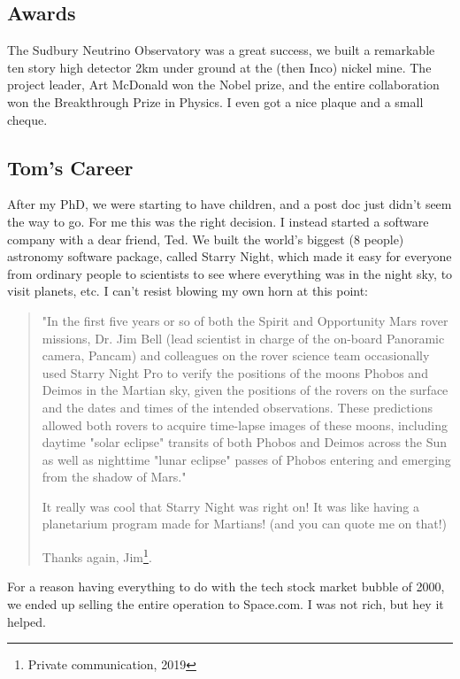 \documentclass[../rzero]{subfiles}
\begin{document}
\subsection*{Awards}
The Sudbury Neutrino Observatory was a great success, we built a remarkable ten story high detector 2km under ground at the (then Inco) nickel mine. The project leader, Art McDonald won the Nobel prize, and the entire collaboration won the Breakthrough Prize in Physics. I even got a nice plaque and a small cheque.

\subsection*{Tom's Career}
After my PhD, we were starting to have children, and a post doc just didn't seem the way to go. For me this was the right decision. I instead started a software company with a dear friend, Ted. We built the world's biggest (8 people) astronomy software package, called Starry Night, which made it easy for everyone from ordinary people to scientists to see where everything was in the night sky, to visit planets, etc. I can't resist blowing my own horn at this point:
\begin{quotation}
	"In the first five years or so of both the Spirit and Opportunity Mars rover missions, Dr. Jim Bell (lead scientist in charge of the on-board Panoramic camera, Pancam) and colleagues on the rover science team occasionally used Starry Night Pro to verify the positions of the moons Phobos and Deimos in the Martian sky, given the positions of the rovers on the surface and the dates and times of the intended observations. These predictions allowed both rovers to acquire time-lapse images of these moons, including daytime "solar eclipse" transits of both Phobos and Deimos across the Sun as well as nighttime "lunar eclipse" passes of Phobos entering and emerging from the shadow of Mars."
 
It really was cool that Starry Night was right on!  It was like having a planetarium program made for Martians!   (and you can quote me on that!)
 
Thanks again,
Jim\footnote{Private communication, 2019}.
\end{quotation} 

For a reason having everything to do with the tech stock market bubble of 2000, we ended up selling the entire operation to Space.com. I was not rich, but hey it helped. 
\end{document}
